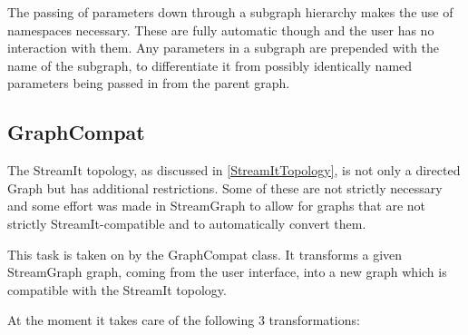 \documentclass[journal]{IEEEtran}
\begin{document}
The passing of parameters down through a subgraph hierarchy makes the use of
namespaces necessary. These are fully automatic though and the user has no
interaction with them. Any parameters in a subgraph are prepended with the
name of the subgraph, to differentiate it from possibly identically named
parameters being passed in from the parent graph.



\subsection{GraphCompat}
\label{sec:GraphCompat}

\noindent The StreamIt topology, as discussed in \ref{StreamItTopology}, is not
only a directed Graph but has additional restrictions. Some of these are not
strictly necessary and some effort was made in StreamGraph to allow for graphs
that are not strictly StreamIt-compatible and to automatically convert them.

This task is taken on by the GraphCompat class. It transforms a given
StreamGraph graph, coming from the user interface, into a new graph which
is compatible with the StreamIt topology.

At the moment it takes care of the following 3 transformations:
\end{document}
